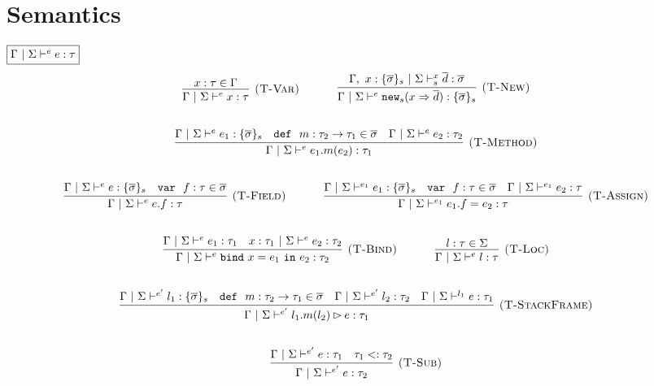 \documentclass{llncs}
\newcommand{\keywadj}[1]{\mathtt{#1}}
\newcommand{\keyw}[1]{\keywadj{#1}~}
\begin{document}
\section{Semantics}

$\fbox{$\Gamma~|~\Sigma \vdash^e e : \tau$}$
\[
\begin{array}{c}
\infer[\textsc{(T-Var)}]
  {\Gamma~|~\Sigma \vdash^e x : \tau}
  {x : \tau \in \Gamma}%
~~~~~~~~~~
\infer[\textsc{(T-New)}]
	{\Gamma~|~\Sigma \vdash^e \keywadj{new}_{s}(x \Rightarrow \overline{d}) : \{ \overline{\sigma} \}_{s}}
	{\Gamma,~x : \{ \overline{\sigma} \}_{s}~|~\Sigma \vdash^x_s \overline{d} : \overline{\sigma}} \\[5ex]

\infer[\textsc{(T-Method)}]
	{\Gamma~|~\Sigma \vdash^e e_1.m(e_2) : \tau_1} 
	{\Gamma~|~\Sigma \vdash^e e_1 : \{ \overline{\sigma} \}_s  & \keyw{def}~ m : \tau_2 \rightarrow \tau_1 \in \overline{\sigma} & \Gamma~|~\Sigma \vdash^e e_2 : \tau_2}\\[5ex]

\infer[\textsc{(T-Field)}]
	{\Gamma~|~\Sigma \vdash^e e.f : \tau} 
	{\Gamma~|~\Sigma \vdash^e e : \{ \overline{\sigma} \}_s & \keyw{var}~ f : \tau \in \overline{\sigma}}%
~~~~~~~~~~
\infer[\textsc{(T-Assign)}]
	{\Gamma~|~\Sigma \vdash^{e_1}  e_1.f=e_2 : \tau} 
	{\Gamma~|~\Sigma \vdash^{e_1} e_1 : \{ \overline{\sigma} \}_s & \keyw{var}~ f : \tau \in \overline{\sigma} & \Gamma~|~\Sigma \vdash^{e_1} e_2 : \tau}\\[5ex]

\infer[\textsc{(T-Bind)}]
  {\Gamma~|~\Sigma \vdash^e \keyw{bind} x = e_1~\keyw{in} e_2 : \tau_2}
  {\Gamma~|~\Sigma \vdash^e e_1 : \tau_1 & x : \tau_1~|~\Sigma \vdash^e e_2 : \tau_2}%
~~~~~~~~~~
\infer[\textsc{(T-Loc)}]
  {\Gamma~|~\Sigma \vdash^e l : \tau}
  {l : \tau \in \Sigma}\\[5ex]

\infer[\textsc{(T-StackFrame)}]
	{\Gamma~|~\Sigma \vdash^{e'} l_1.m(l_2) \rhd e : \tau_1}
	{\Gamma~|~\Sigma \vdash^{e'} l_1 : \{ \overline{\sigma} \}_s & \keyw{def}~ m : \tau_2 \rightarrow \tau_1 \in \overline{\sigma} & \Gamma~|~\Sigma \vdash^{e'} l_2 : \tau_2 & \Gamma~|~\Sigma \vdash^{l_1} e : \tau_1} \\[5ex]

\infer[\textsc{(T-Sub)}]
  {\Gamma~|~\Sigma \vdash^{e'} e : \tau_2}
  {\Gamma~|~\Sigma \vdash^{e'} e : \tau_1 & \tau_1 <: \tau_2}\\[5ex]

\end{array}
\]
\end{document}
